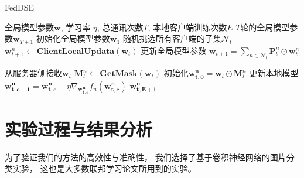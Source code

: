 \begin{algorithm}[thbp]
    \caption{FedDSE}\label{alg:feddse}
    \begin{algorithmic}[1]
    \Require 全局模型参数$\mathbf{w}$,
                学习率 $\eta$,
                总通讯次数$T$,
                本地客户端训练次数$E$
    \Ensure $T$轮的全局模型参数$\mathbf{w}_{T+1}$
    \State 初始化全局模型参数$\mathbf{w}_1$
      {}
            \State 随机挑选所有客户端的子集$\mathcal{N}_t$
                \State $\mathbf{w}_{t+1}^n \leftarrow \textbf{ClientLocalUpdata}(\mathbf{w}_t)$
            \EndFor
            \State 更新全局模型参数
            $\mathbf{w}_{t+1} = 
            \sum\nolimits_{n \in \mathcal{N}_t} \mathbf{P}_t^n 
            \odot \mathbf{w}_t^n $
        \EndFor
    \EndProcedure

        \State 从服务器侧接收$\mathbf{w}_t$
        \State $\mathbf{M}_t^n \leftarrow \textbf{GetMask}(\mathbf{w}_t)$
        \State 初始化$\mathbf{w^n_{t,0}} = \mathbf{w}_t \odot \mathbf{M}_t^n$
            \State 更新本地模型
            $\mathbf{w^n_{t,e+1}} = \mathbf{w^n_{t,e}} - \eta \nabla_{\mathbf{w^n_{t,e}}} f_n(\mathbf{w^n_{t,e}})$
        \EndFor
        \State \Return $\mathbf{w^n_{t,E+1}}$
    \EndProcedure
\end{algorithmic}
\end{algorithm}


\section{实验过程与结果分析}
\label{sec:feddseexp}
为了验证我们的方法的高效性与准确性，
我们选择了基于卷积神经网络的图片分类实验，
这也是大多数联邦学习论文所用到的实验。
